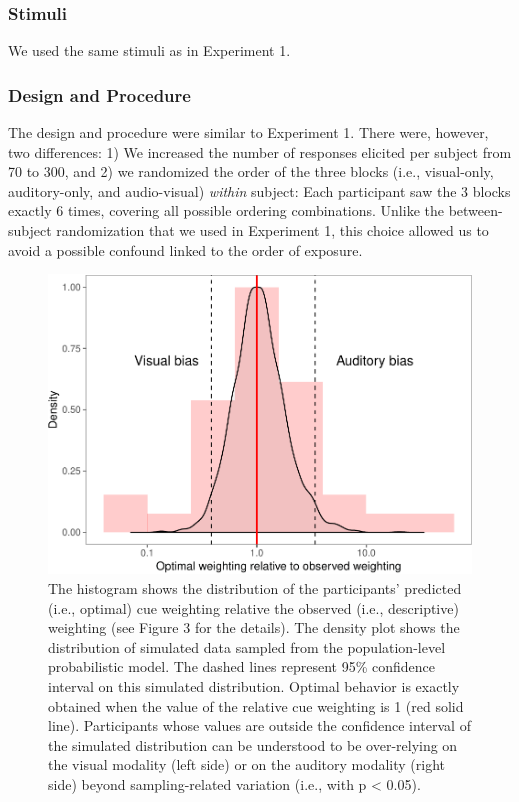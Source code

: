\documentclass[english,,man,floatsintext]{apa6}
\theoremstyle{definition}
\theoremstyle{definition}
\theoremstyle{definition}
\theoremstyle{remark}
\begin{document}
\subsubsection{Stimuli}\label{stimuli-1}

We used the same stimuli as in Experiment 1.

\subsubsection{Design and Procedure}\label{design-and-procedure-1}

The design and procedure were similar to Experiment 1. There were,
however, two differences: 1) We increased the number of responses
elicited per subject from 70 to 300, and 2) we randomized the order of
the three blocks (i.e., visual-only, auditory-only, and audio-visual)
\emph{within} subject: Each participant saw the 3 blocks exactly 6
times, covering all possible ordering combinations. Unlike the
between-subject randomization that we used in Experiment 1, this choice
allowed us to avoid a possible confound linked to the order of exposure.

\begin{figure}[!h]
\includegraphics[width=\textwidth]{ms_r2_files/figure-latex/weights-1} \caption{The histogram shows the distribution of the participants' predicted (i.e., optimal) cue weighting relative the observed (i.e., descriptive) weighting (see Figure 3 for the details). The density plot shows the distribution of simulated data sampled from the population-level probabilistic model. The dashed lines represent 95\% confidence interval on this simulated distribution. Optimal behavior is exactly obtained when the value of the relative cue weighting is 1 (red solid line). Participants whose values are outside the confidence interval of the simulated distribution can be understood to be over-relying on the visual modality (left side) or on the auditory modality (right side) beyond sampling-related variation (i.e., with p < 0.05).}\label{fig:weights}
\end{figure}
\end{document}
